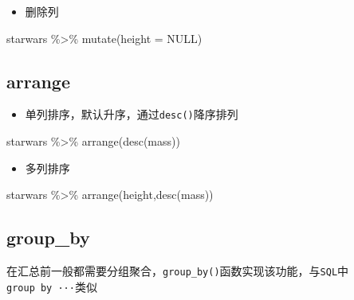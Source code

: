 \documentclass[
]{book}
\newenvironment{Shaded}{\begin{snugshade}}{\end{snugshade}}
\newcommand{\AttributeTok}[1]{\textcolor[rgb]{0.77,0.63,0.00}{#1}}
\newcommand{\ConstantTok}[1]{\textcolor[rgb]{0.00,0.00,0.00}{#1}}
\newcommand{\FunctionTok}[1]{\textcolor[rgb]{0.00,0.00,0.00}{#1}}
\newcommand{\NormalTok}[1]{#1}
\newcommand{\SpecialCharTok}[1]{\textcolor[rgb]{0.00,0.00,0.00}{#1}}
\providecommand{\tightlist}{%
  \setlength{\itemsep}{0pt}\setlength{\parskip}{0pt}}
\begin{document}
\begin{itemize}
\tightlist
\item
  删除列
\end{itemize}

\begin{Shaded}
\begin{Highlighting}[]
\NormalTok{starwars }\SpecialCharTok{\%\textgreater{}\%} \FunctionTok{mutate}\NormalTok{(}\AttributeTok{height =} \ConstantTok{NULL}\NormalTok{)}
\end{Highlighting}
\end{Shaded}

\hypertarget{arrange}{%
\subsection{arrange}\label{arrange}}

\begin{itemize}
\tightlist
\item
  单列排序，默认升序，通过\texttt{desc()}降序排列
\end{itemize}

\begin{Shaded}
\begin{Highlighting}[]
\NormalTok{starwars }\SpecialCharTok{\%\textgreater{}\%} 
  \FunctionTok{arrange}\NormalTok{(}\FunctionTok{desc}\NormalTok{(mass))}
\end{Highlighting}
\end{Shaded}

\begin{itemize}
\tightlist
\item
  多列排序
\end{itemize}

\begin{Shaded}
\begin{Highlighting}[]
\NormalTok{starwars }\SpecialCharTok{\%\textgreater{}\%} 
  \FunctionTok{arrange}\NormalTok{(height,}\FunctionTok{desc}\NormalTok{(mass))}
\end{Highlighting}
\end{Shaded}

\hypertarget{group_by}{%
\subsection{group\_by}\label{group_by}}

在汇总前一般都需要分组聚合，\texttt{group\_by()}函数实现该功能，与\texttt{SQL}中\texttt{group\ by\ ···}类似
\end{document}
